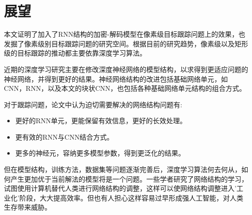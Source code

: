 \section{展望}
本文证明了加入了RNN结构的加密-解码模型在像素级目标跟踪问题上的效果，也发掘了像素级别目标跟踪问题的研究空间。根据目前的研究趋势，像素级以及矩形级的目标跟踪的推动都主要依靠深度学习算法。
\par
近期的深度学习研究主要在修改深度神经网络的模型结构，以求得到更适应问题的神经网络，并得到更好的结果。神经网络结构的改进包括基础网络单元，如CNN，RNN，以及本文的块状CNN，也包括各种基础网络单元结构的组合方式。
\par
对于跟踪问题，论文中认为迫切需要解决的网络结构问题有:
\begin{itemize}
    \item 更好的RNN单元，更能保留有效信息，更好的长效处理。
    \item 更有效的RNN与CNN结合方式。
    \item 更多的神经元，容纳更多模型参数，得到更泛化的结果。
\end{itemize}
\par
但在模型结构，训练方法，数据集等问题逐渐完善后，深度学习算法何去何从，如何产生更加优于当前解法的模型将是一个问题。一些学者研究了网络结构的学习\supercite{cortes2017adanet}，试图使用计算机替代人类进行网络结构的调整，这样可以使网络结构调整进入'工业化'阶段，大大提高效率。但也有人担心这样容易过早形成强人工智能\supercite{kurzweil2005singularity}，对人类生存带来威胁。

